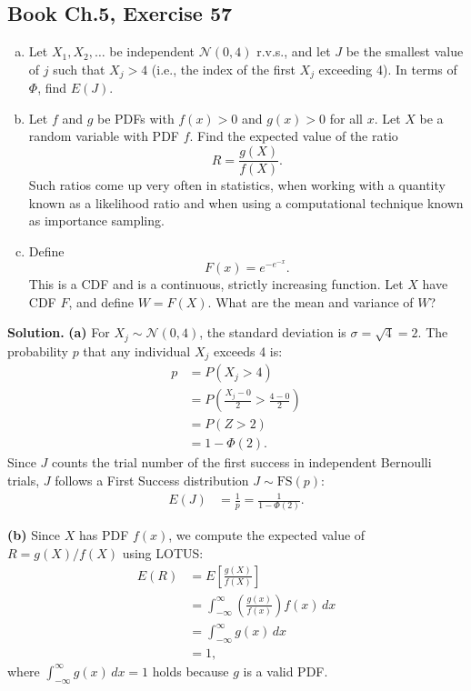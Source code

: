 \documentclass[11pt,a4paper]{article}
\begin{document}
\vspace{10pt}
\subsection{Book Ch.5, Exercise 57}
\begin{tcolorbox}[title={Book Ch.5, Exercise 57}]
\begin{enumerate}[(a)]
\item Let $X_1, X_2, \dots$ be independent $\mathcal{N}(0, 4)$ r.v.s., and let $J$ be the smallest value of $j$ such that $X_j > 4$ (i.e., the index of the first $X_j$ exceeding 4). In terms of $\Phi$, find $E(J)$.
\item Let $f$ and $g$ be PDFs with $f(x) > 0$ and $g(x) > 0$ for all $x$. Let $X$ be a random variable with PDF $f$. Find the expected value of the ratio
\[
R = \frac{g(X)}{f(X)}.
\]
Such ratios come up very often in statistics, when working with a quantity known as a likelihood ratio and when using a computational technique known as importance sampling.
\item Define
\[
F(x) = e^{-e^{-x}}.
\]
This is a CDF and is a continuous, strictly increasing function. Let $X$ have CDF $F$, and define $W = F(X)$. What are the mean and variance of $W$?
\end{enumerate}
\end{tcolorbox}

\noindent \textbf{Solution.} \textbf{(a)} For $X_j \sim \mathcal{N}(0, 4)$, the standard deviation is $\sigma = \sqrt{4} = 2$. The probability $p$ that any individual $X_j$ exceeds 4 is:
\begin{align*}
p &= P(X_j > 4) \\
&= P\left( \frac{X_j - 0}{2} > \frac{4 - 0}{2} \right) \\
&= P(Z > 2) \\
&= 1 - \Phi(2).
\end{align*}
Since $J$ counts the trial number of the first success in independent Bernoulli trials, $J$ follows a First Success distribution $J \sim \text{FS}(p)$:
\begin{align*}
E(J) &= \frac{1}{p} = \frac{1}{1 - \Phi(2)}.
\end{align*}

\vspace{4pt}
\noindent \textbf{(b)} Since $X$ has PDF $f(x)$, we compute the expected value of $R = g(X)/f(X)$ using LOTUS:
\begin{align*}
E(R) &= E\left[ \frac{g(X)}{f(X)} \right] \\
&= \int_{-\infty}^{\infty} \left( \frac{g(x)}{f(x)} \right) f(x) \, dx \\
&= \int_{-\infty}^{\infty} g(x) \, dx \\
&= 1,
\end{align*}
where $\int_{-\infty}^{\infty} g(x) \, dx = 1$ holds because $g$ is a valid PDF.
\end{document}
